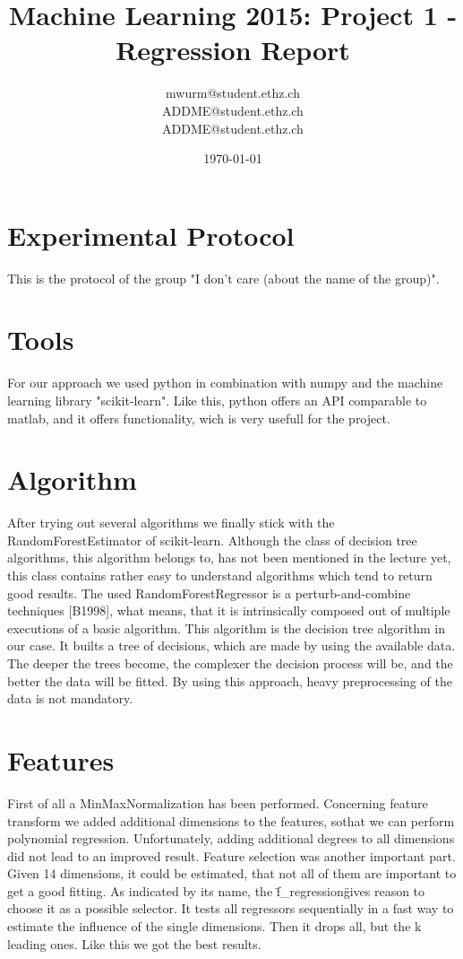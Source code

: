 \documentclass[a4paper, 10pt]{article}
\title{Machine Learning 2015: Project 1 - Regression Report}
\author{mwurm@student.ethz.ch\\ ADDME@student.ethz.ch\\ ADDME@student.ethz.ch\\}
\date{\today}
\begin{document}
\maketitle

\section*{Experimental Protocol}
This is the protocol of the group "I don't care (about the name of the group)".

\section{Tools}
For our approach we used python in combination with numpy and the machine learning library "scikit-learn". Like this, python offers an API comparable to matlab, and it offers functionality, wich is very usefull for the project.

\section{Algorithm}
After trying out several algorithms we finally stick with the RandomForestEstimator of scikit-learn. Although the class of decision tree algorithms, this algorithm belongs to, has not been mentioned in the lecture yet, this class contains rather easy to understand algorithms which tend to return good results.
The used RandomForestRegressor is a perturb-and-combine techniques [B1998], what means, that it is intrinsically composed out of multiple executions of a basic algorithm. This algorithm is the decision tree algorithm in our case.
It builts a tree of decisions, which are made by using the available data. The deeper the trees become, the complexer the decision process will be, and the better the data will be fitted. By using this approach, heavy preprocessing of the data is not mandatory.

\section{Features}
First of all a MinMaxNormalization has been performed.
Concerning feature transform we added additional dimensions to the features, sothat we can perform polynomial regression. Unfortunately, adding additional degrees to all dimensions did not lead to an improved result. 
Feature selection was another important part. Given 14 dimensions, it could be estimated, that not all of them are important to get a good fitting. As indicated by its name, the \"f\_regression\" gives reason to choose it as a possible selector. It tests all regressors sequentially in a fast way to estimate the influence of the single dimensions. Then it drops all, but the k leading ones. Like this we got the best results.
\end{document}
